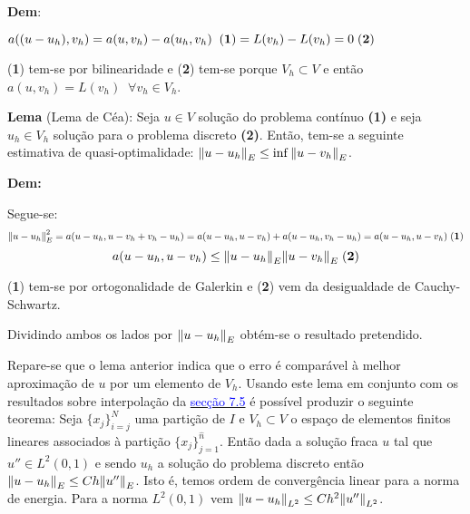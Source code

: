 \documentclass{article}
\theoremstyle{definition}
\theoremstyle{plain}
\numberwithin{equation}{section}
\newcommand{\tab}{\hspace{10mm}}
\begin{document}
\vspace{1mm}

\textbf{Dem}:

\vspace{1mm}

$a((u-u_h),v_h)=a(u,v_h)-a(u_h,v_h) \; \; \textrm(\textbf{1})=L(v_h)-L(v_h)=0 \;\textrm(\textbf{2})$

\vspace{1mm}

(\textbf{1}) tem-se por bilinearidade e (\textbf{2}) tem-se porque $V_h \subset V$ e então $a(u,v_h)=L(v_h) \; \; \forall v_h \in V_h$.
 
 \vspace{1mm}
 
 \textbf{Lema} (Lema de Céa): Seja $u \in V$ solução do problema contínuo \textbf{(1)} e seja $u_h\in V_h$ solução para o problema discreto \textbf{(2)}. Então, tem-se a seguinte estimativa de quasi-optimalidade: $\norm{u-u_h}_E\leq\inf\norm{u-v_h}_E$. 

\vspace{1mm}

\textbf{Dem:}

\vspace{1mm}

Segue-se:
\begin{equation*}
    \norm{u-u_h}_E^2=a(u-u_h,u-v_h+v_h-u_h)=a(u-u_h,u-v_h)+a(u-u_h,v_h-u_h)=a(u-u_h,u-v_h) \; \textrm{(\textbf{1})} 
\end{equation*}
\begin{equation*}
    a(u-u_h,u-v_h) \leq \norm{u-u_h}_E\norm{u-v_h}_E \; \textrm{(\textbf{2})}
\end{equation*}

\vspace{1mm}

(\textbf{1}) tem-se por ortogonalidade de Galerkin e (\textbf{2}) vem da desigualdade de Cauchy-Schwartz.

Dividindo ambos os lados por $\norm{u-u_h}_E$ obtém-se o resultado pretendido.
\vspace{1mm}

\tab Repare-se que o lema anterior indica que o erro é comparável à melhor aproximação de $u$ por um elemento de $V_h$. Usando este lema em conjunto com os resultados sobre interpolação da \hyperref[sec:7.5]{\textcolor{blue}{secção 7.5}} é possível produzir o seguinte teorema: Seja $\{x_j\}^N_{i=j}$ uma partição de $I$ e $V_h \subset V$ o espaço de elementos finitos lineares associados à partição $\{x_j\}_{j=1}^\hat{n}$. Então dada a solução fraca $u$ tal que $u'' \in L^2(0,1)$ e sendo $u_h$ a solução do problema discreto então $\norm{u-u_h}_E\leq Ch\norm{u''}_{E}$. Isto é, temos ordem de convergência linear para a norma de energia. Para a norma $L^2(0,1)$ vem $\norm{u-u_h}_{L^2}\leq Ch^2\norm{u''}_{L^2}$.
\end{document}
